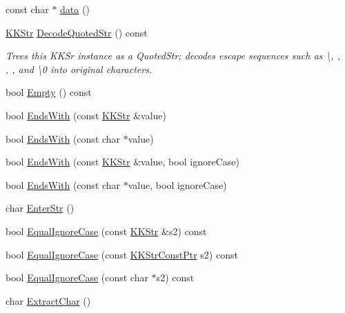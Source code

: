 \begin{DoxyCompactItemize}
const char $\ast$ \hyperlink{class_k_k_b_1_1_k_k_str_a720123eb3b466a3074618ccf7cf99d66}{data} ()
\item 
\hyperlink{class_k_k_b_1_1_k_k_str}{K\+K\+Str} \hyperlink{class_k_k_b_1_1_k_k_str_aa681f6772b30399872cec9a54056f736}{Decode\+Quoted\+Str} () const 
\begin{DoxyCompactList}\small\item\em Trees this K\+K\+Sr instance as a Quoted\+Str; decodes escape sequences such as \textquotesingle{}\textbackslash{}\textquotesingle{}, \textquotesingle{}\textquotesingle{}, \textquotesingle{}~\newline
\textquotesingle{}, \textquotesingle{}\textquotesingle{}, and \textquotesingle{}\textbackslash{}0\textquotesingle{} into original characters. \end{DoxyCompactList}\item 
bool \hyperlink{class_k_k_b_1_1_k_k_str_ac69942f73fffd672ec2a6e1c410afdb6}{Empty} () const 
\item 
bool \hyperlink{class_k_k_b_1_1_k_k_str_af3cb726ba5afedf8185ecc3d4f2db956}{Ends\+With} (const \hyperlink{class_k_k_b_1_1_k_k_str}{K\+K\+Str} \&value)
\item 
bool \hyperlink{class_k_k_b_1_1_k_k_str_a8d93ecb03df486569f4432eed4b46ddd}{Ends\+With} (const char $\ast$value)
\item 
bool \hyperlink{class_k_k_b_1_1_k_k_str_abd542003414bf78e32a44d36da6c3035}{Ends\+With} (const \hyperlink{class_k_k_b_1_1_k_k_str}{K\+K\+Str} \&value, bool ignore\+Case)
\item 
bool \hyperlink{class_k_k_b_1_1_k_k_str_a8cacd3b4022d278d587a498ec0d701e0}{Ends\+With} (const char $\ast$value, bool ignore\+Case)
\item 
char \hyperlink{class_k_k_b_1_1_k_k_str_a0a8dd7e5b366b397a235a9a0d6ec97fc}{Enter\+Str} ()
\item 
bool \hyperlink{class_k_k_b_1_1_k_k_str_a562f9696417c53f66bc4088eac072ab5}{Equal\+Ignore\+Case} (const \hyperlink{class_k_k_b_1_1_k_k_str}{K\+K\+Str} \&s2) const 
\item 
bool \hyperlink{class_k_k_b_1_1_k_k_str_a108e104f8d00f09d70829590dece3a35}{Equal\+Ignore\+Case} (const \hyperlink{class_k_k_b_1_1_k_k_str_af0b636488a4f7497e5f65a576ccb55c8}{K\+K\+Str\+Const\+Ptr} s2) const 
\item 
bool \hyperlink{class_k_k_b_1_1_k_k_str_a6fc15d795a9931ded60ab2d7b1587b45}{Equal\+Ignore\+Case} (const char $\ast$s2) const 
\item 
char \hyperlink{class_k_k_b_1_1_k_k_str_af6329b138b7a75b7037fcf4370fa228e}{Extract\+Char} ()

\end{DoxyCompactItemize}
